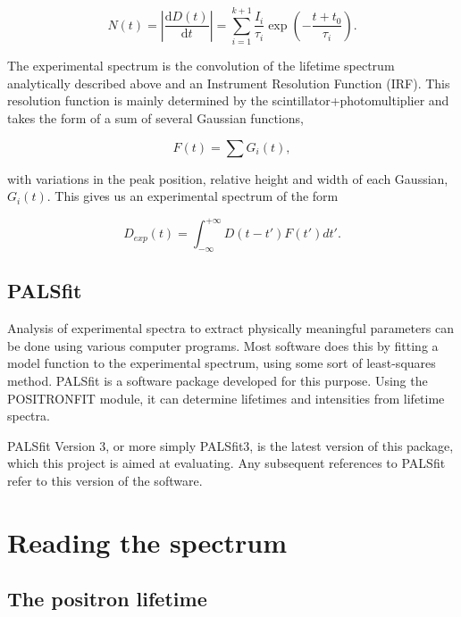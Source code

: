 \begin{equation}
    N(t) = \left|\frac{\mathrm{d}D(t)}{\mathrm{d}t}\right| = \sum_{i=1}^{k+1}\frac{I_i}{\tau_i}\exp\left(-\frac{t + t_0}{\tau_i}\right).
\end{equation}

The experimental spectrum is the convolution of the lifetime spectrum analytically described above and an Instrument Resolution Function (IRF). This resolution function is mainly determined by the scintillator+photomultiplier and takes the form of a sum of several Gaussian functions, 

\begin{equation}
    F(t) = \sum G_i(t),
\end{equation}

with variations in the peak position, relative height and width of each Gaussian, $G_i(t)$. This gives us an experimental spectrum of the form

\begin{equation}
    D_{exp} (t) = \int_{-\infty}^{+\infty} D(t-t') F(t') dt'.
\end{equation}

\section{PALSfit}

Analysis of experimental spectra to extract physically meaningful parameters can be done using various computer programs. Most software does this by fitting a model function to the experimental spectrum, using some sort of least-squares method. PALSfit is a software package developed for this purpose. Using the POSITRONFIT module, it can determine lifetimes and intensities from lifetime spectra. 

PALSfit Version 3, or more simply PALSfit3, is the latest version of this package, which this project is aimed at evaluating. Any subsequent references to PALSfit refer to this version of the software.




\chapter{Reading the spectrum}

\section{The positron lifetime}

